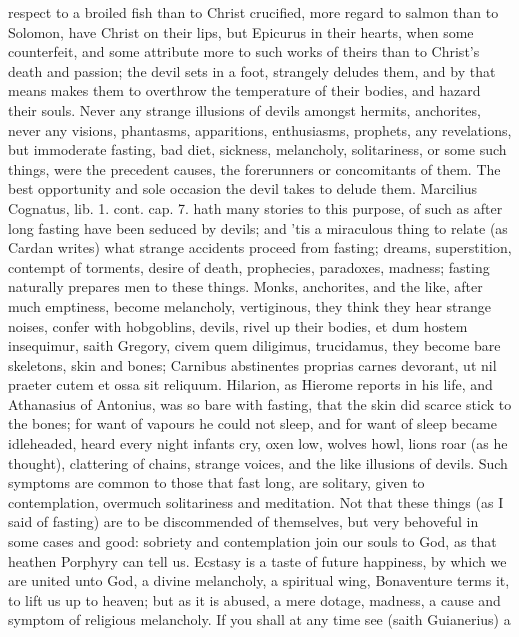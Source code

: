 {respect to a broiled fish than to Christ crucified, more regard to
salmon than to Solomon, have Christ on their lips, but Epicurus in
their hearts, when some counterfeit, and some attribute more to such
works of theirs than to Christ's death and passion; the devil sets in a
foot, strangely deludes them, and by that means makes them to overthrow
the temperature of their bodies, and hazard their souls. Never any
strange illusions of devils amongst hermits, anchorites, never any
visions, phantasms, apparitions, enthusiasms, prophets, any
revelations, but immoderate fasting, bad diet, sickness, melancholy,
solitariness, or some such things, were the precedent causes, the
forerunners or concomitants of them. The best opportunity and sole
occasion the devil takes to delude them. Marcilius Cognatus, lib. 1.
cont. cap. 7. hath many stories to this purpose, of such as after long
fasting have been seduced by devils; and 'tis a miraculous thing
to relate (as Cardan writes) what strange accidents proceed from
fasting; dreams, superstition, contempt of torments, desire of death,
prophecies, paradoxes, madness; fasting naturally prepares men to these
things. Monks, anchorites, and the like, after much emptiness, become
melancholy, vertiginous, they think they hear strange noises, confer
with hobgoblins, devils, rivel up their bodies, et dum hostem
insequimur, saith Gregory, civem quem diligimus, trucidamus, they
become bare skeletons, skin and bones; Carnibus abstinentes proprias
carnes devorant, ut nil praeter cutem et ossa sit reliquum. Hilarion,
as Hierome reports in his life, and Athanasius of Antonius, was
so bare with fasting, that the skin did scarce stick to the bones; for
want of vapours he could not sleep, and for want of sleep became
idleheaded, heard every night infants cry, oxen low, wolves howl, lions
roar (as he thought), clattering of chains, strange voices, and the
like illusions of devils. Such symptoms are common to those that fast
long, are solitary, given to contemplation, overmuch solitariness and
meditation. Not that these things (as I said of fasting) are to be
discommended of themselves, but very behoveful in some cases and good:
sobriety and contemplation join our souls to God, as that heathen
Porphyry can tell us. Ecstasy is a taste of future
happiness, by which we are united unto God, a divine melancholy, a
spiritual wing, Bonaventure terms it, to lift us up to heaven; but as
it is abused, a mere dotage, madness, a cause and symptom of religious
melancholy. If you shall at any time see (saith Guianerius) a
}
